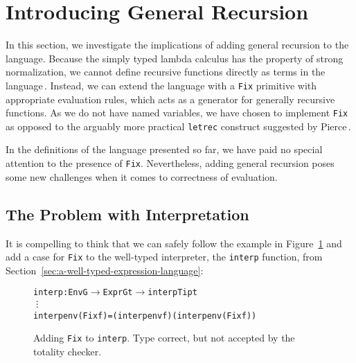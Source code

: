 \section{Introducing General Recursion}
\label{sec:partiality}

In this section, we investigate the implications of adding general recursion to the language. Because the simply typed lambda calculus has the property of strong normalization, we cannot define recursive functions directly as terms in the language\,\cite[p. 143]{Pierce:TypeSystems}. Instead, we can extend the language with a \texttt{Fix} primitive with appropriate evaluation rules, which acts as a generator for generally recursive functions. As we do not have named variables, we have chosen to implement \texttt{Fix} as opposed to the arguably more practical \texttt{letrec} construct suggested by Pierce\,\cite[p. 144]{Pierce:TypeSystems}.

In the definitions of the language presented so far, we have paid no special attention to the presence of \texttt{Fix}. Nevertheless, adding general recursion poses some new challenges when it comes to correctness of evaluation.

\subsection{The Problem with Interpretation}
It is compelling to think that we can safely follow the example in Figure~\ref{fig:interp-fix} and add a case for \texttt{Fix} to the well-typed interpreter, the \texttt{interp} function, from Section~\ref{sec:a-well-typed-expression-language}:

\begin{figure}
\begin{alltt}
  interp : Env G \(\rightarrow\) Expr G t \(\rightarrow\) interpTip t
  \vdots
  interp env (Fix f) = (interp env f) (interp env (Fix f))
\end{alltt}
\caption{Adding \texttt{Fix} to \texttt{interp}. Type correct, but not accepted by the totality checker.}
\label{fig:interp-fix}
\end{figure}

